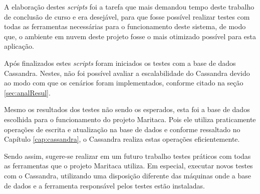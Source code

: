 A elaboração destes \textit{scripts} foi a tarefa que mais demandou tempo deste trabalho de conclusão de curso e era desejável, para que fosse possível realizar testes com todas as ferramentas necessárias para o funcionamento deste sistema, de modo que, o ambiente em nuvem deste projeto fosse o mais otimizado possível para esta aplicação.

Após finalizados estes \textit{scripts} foram iniciados os testes com a base de dados Cassandra. Nestes, não foi possível avaliar a escalabilidade do Cassandra devido ao modo com que os cenários foram implementados, conforme citado na seção \ref{sec:analResul}.

Mesmo os resultados dos testes não sendo os esperados, esta foi a base de dados escolhida para o funcionamento do projeto Maritaca. Pois ele utiliza praticamente operações de escrita e atualização na base de dados e conforme ressaltado no Capítulo \ref{cap:cassandra}, o Cassandra realiza estas operações eficientemente. 

Sendo assim, sugere-se realizar em um futuro trabalho testes práticos com todas as ferramentas que o projeto Maritaca utiliza. Em especial, executar novos testes com o Cassandra, utilizando uma disposição diferente das máquinas onde a base de dados e a ferramenta responsável pelos testes estão instaladas.